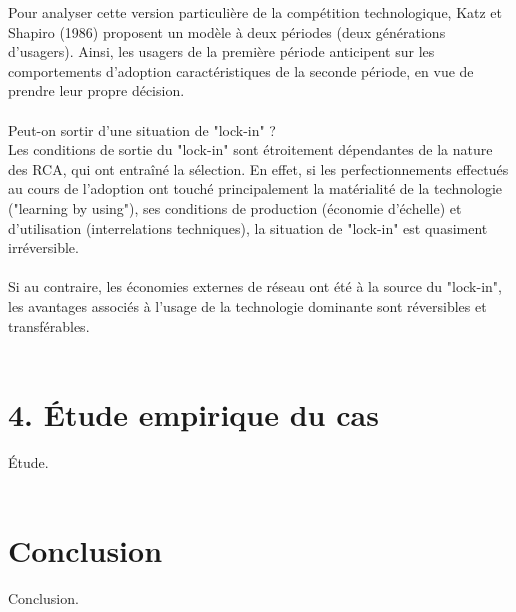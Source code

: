 \documentclass[a4paper, 10pt]{article}
\begin{document}
Pour analyser cette version particulière de la compétition technologique,
Katz et Shapiro (1986) proposent un modèle à deux périodes (deux générations d'usagers).
Ainsi, les usagers de la première période anticipent sur les comportements d'adoption caractéristiques de la seconde période,
en vue de prendre leur propre décision.\\ \\
Peut-on sortir d'une situation de "lock-in" ?\\
Les conditions de sortie du "lock-in" sont étroitement dépendantes de la nature des RCA, qui ont entraîné la sélection.
En effet, si les perfectionnements effectués au cours de l'adoption ont touché principalement la matérialité de la technologie
("learning by using"), ses conditions de production (économie d'échelle) et d'utilisation (interrelations techniques),
la situation de "lock-in" est quasiment irréversible.\\ \\
Si au contraire, les économies externes de réseau ont été à la source du "lock-in",
les avantages associés à l'usage de la technologie dominante sont réversibles et transférables.\\ \\

\section*{4. Étude empirique du cas}
\indent

Étude.\\ \\

\section*{Conclusion}
\indent

Conclusion.\\ \\

\newpage
\end{document}
